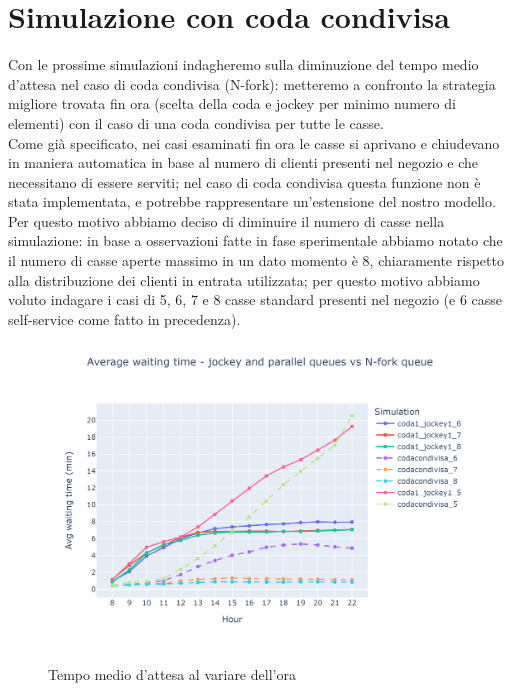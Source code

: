 \section{Simulazione con coda condivisa}

Con le prossime simulazioni indagheremo sulla diminuzione del tempo medio d'attesa nel caso di coda condivisa (N-fork): metteremo a confronto la strategia migliore trovata fin ora (scelta della coda e jockey per minimo numero di elementi) con il caso di una coda condivisa per tutte le casse. \\
Come già specificato, nei casi esaminati fin ora le casse si aprivano e chiudevano in maniera automatica in base al numero di clienti presenti nel negozio e che necessitano di essere serviti; nel caso di coda condivisa questa funzione non è stata implementata, e potrebbe rappresentare un'estensione del nostro modello. Per questo motivo abbiamo deciso di diminuire il numero di casse nella simulazione: in base a osservazioni fatte in fase sperimentale abbiamo notato che il numero di casse aperte massimo in un dato momento è 8, chiaramente rispetto alla distribuzione dei clienti in entrata utilizzata; per questo motivo abbiamo voluto indagare i casi di 5, 6, 7 e 8 casse standard presenti nel negozio (e 6 casse self-service come fatto in precedenza).

\begin{figure}[H]
	\centering
	\includegraphics[width=12cm]{"images/results/avg_wt_codacondivisa.png"}
	\label{fig:avg_wt_codacondivisa}
	\caption{Tempo medio d'attesa al variare dell'ora}
\end{figure}

